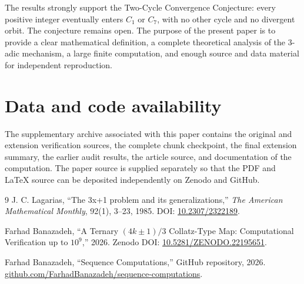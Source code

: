 \documentclass[11pt]{article}
\begin{document}
The results strongly support the Two-Cycle Convergence Conjecture: every positive integer eventually enters $C_1$ or $C_7$, with no other cycle and no divergent orbit. The conjecture remains open. The purpose of the present paper is to provide a clear mathematical definition, a complete theoretical analysis of the $3$-adic mechanism, a large finite computation, and enough source and data material for independent reproduction.

\section*{Data and code availability}
The supplementary archive associated with this paper contains the original and extension verification sources, the complete chunk checkpoint, the final extension summary, the earlier audit results, the article source, and documentation of the computation. The paper source is supplied separately so that the PDF and LaTeX source can be deposited independently on Zenodo and GitHub.

\begin{thebibliography}{9}
J. C. Lagarias, ``The 3x+1 problem and its generalizations,'' \emph{The American Mathematical Monthly}, 92(1), 3--23, 1985. DOI: \href{https://doi.org/10.2307/2322189}{10.2307/2322189}.

Farhad Banazadeh, ``A Ternary $(4k\pm1)/3$ Collatz-Type Map: Computational Verification up to $10^9$,'' 2026. Zenodo DOI: \href{https://doi.org/10.5281/ZENODO.22195651}{10.5281/ZENODO.22195651}.

Farhad Banazadeh, ``Sequence Computations,'' GitHub repository, 2026. \href{https://github.com/FarhadBanazadeh/sequence-computations}{github.com/FarhadBanazadeh/sequence-computations}.
\end{thebibliography}
\end{document}
